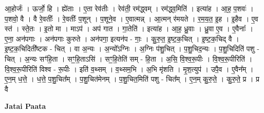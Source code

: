 \documentclass[17pt]{extarticle}
\begin{document}
आ॒होर्जः॑ । ऊर्जो॒ हि । ह्ये॑ताः । ए॒ता रेव॑तीः । रेव॑ती॒ रम॑द्ध्वम् । रम॑द्ध्व॒मिति॑ । इत्या॑ह । आ॒ह॒ प॒शवः॑ । प॒शवो॒ वै । वै रे॒वतीः᳚ । रे॒वतीः᳚ प॒शून् । प॒शूने॒व । ए॒वात्मन्न् । आ॒त्मन् र॑मयते । र॒म॒य॒त॒ इ॒ह । इ॒हैव । ए॒व स्त॑ । स्ते॒तः । इ॒तो मा । माऽप॑ । अप॑ गात । गा॒तेति॑ । इत्या॑ह । आ॒ह॒ ध्रु॒वाः । ध्रु॒वा ए॒व । ए॒वैनाः᳚ । ए॒ना॒ अन॑पगाः । अन॑पगाः कुरुते । अन॑पगा॒ इत्यन॑प - गाः॒ । कु॒रु॒त॒ इ॒ष्ट॒क॒चित् । इ॒ष्ट॒क॒चिद् वै । इ॒ष्ट॒क॒चिदिती᳚ष्टक - चित् । वा अ॒न्यः । अ॒न्यो᳚ऽग्निः । अ॒ग्निः प॑शु॒चित् । प॒शु॒चिद॒न्यः । प॒शु॒चिदिति॑ पशु - चित् । अ॒न्यः सꣳ॑हि॒ता । सꣳ॒॒हि॒ताऽसि॑ । सꣳ॒॒हि॒तेति॑ सम् - हि॒ता । अ॒सि॒ वि॒श्व॒रू॒पीः । वि॒श्व॒रू॒पीरिति॑ । वि॒श्व॒रू॒पीरिति॑ विश्व - रू॒पीः । इति॑ व॒थ्सम् । व॒थ्सम॒भि । अ॒भि मृ॑शति । मृ॒श॒त्युप॑ । उपै॒व । ए॒वैन᳚म् । ए॒न॒म् ध॒त्ते॒ । ध॒त्ते॒ प॒शु॒चित᳚म् । प॒शु॒चित॑मेनम् । प॒शु॒चित॒मिति॑ पशु - चित᳚म् । ए॒न॒म् कु॒रु॒ते॒ । कु॒रु॒ते॒ प्र । प्र वै \newline

\textbf{Jatai Paata} \newline
\end{document}
